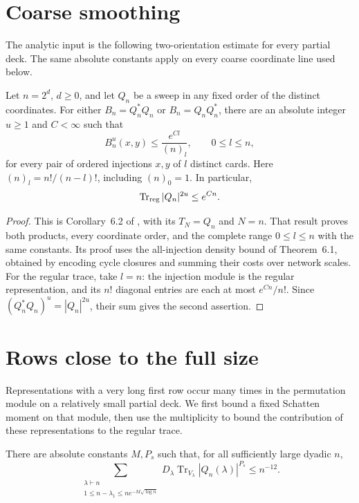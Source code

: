 \section{Coarse smoothing}
\label{ten:lowplanes:part:21}
The analytic input is the following two-orientation estimate for every partial deck. The same absolute constants apply on every coarse coordinate line used below.

\begin{proposition}\label{prop:coarse-smoothing}
Let $n=2^d$, $d\ge0$, and let $Q_n$ be a sweep in any fixed order of the distinct coordinates. For either $B_n=Q_n^*Q_n$ or $B_n=Q_nQ_n^*$, there are an absolute integer $u\ge1$ and $C<\infty$ such that
\begin{equation}
 B_n^u(x,y)\le\frac{e^{Cl}}{(n)_l},\qquad 0\le l\le n,
 \label{ten:lowplanes:eq:2}
\end{equation}
for every pair of ordered injections $x,y$ of $l$ distinct cards. Here $(n)_l=n!/(n-l)!$, including $(n)_0=1$. In particular,
\begin{equation}
 \operatorname{Tr}_{\rm reg}|Q_n|^{2u}\le e^{Cn}.
 \label{ten:lowplanes:eq:9}
\end{equation}
\end{proposition}
\begin{proof}
This is Corollary~6.2 of \citet{OpenAI2026Routing}, with its $T_N=Q_n$ and $N=n$. That result proves both products, every coordinate order, and the complete range $0\le l\le n$ with the same constants. Its proof uses the all-injection density bound of Theorem~6.1, obtained by encoding cycle closures and summing their costs over network scales. For the regular trace, take $l=n$: the injection module is the regular representation, and its $n!$ diagonal entries are each at most $e^{Cn}/n!$. Since $(Q_n^*Q_n)^u=|Q_n|^{2u}$, their sum gives the second assertion.
\end{proof}

\section{Rows close to the full size}
\label{ten:lowplanes:part:127}
Representations with a very long first row occur many times in the permutation module on a relatively small partial deck. We first bound a fixed Schatten moment on that module, then use the multiplicity to bound the contribution of these representations to the regular trace.

\begin{proposition}\label{prop:sparse-rows}
There are absolute constants $M,P_s$ such that, for all sufficiently large dyadic $n$,
\begin{equation}\label{eq:sparse-contribution}
 \sum_{\substack{\lambda\vdash n\\1\le n-\lambda_1\le n e^{-M\sqrt{\log n}}}}
 D_\lambda\operatorname{Tr}_{V_\lambda}|Q_n(\lambda)|^{P_s}
 \le n^{-12}.
\end{equation}
\end{proposition}

